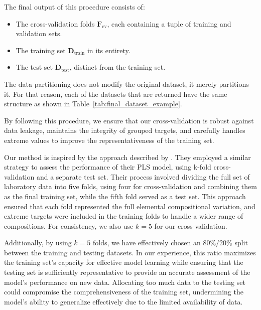 The final output of this procedure consists of:
\begin{itemize}
    \item The cross-validation folds \(\mathbf{F}_\text{cv}\), each containing a tuple of training and validation sets.
    \item The training set \(\mathbf{D}_\text{train}\) in its entirety.
    \item The test set \(\mathbf{D}_\text{test}\), distinct from the training set.
\end{itemize}

The data partitioning does not modify the original dataset, it merely partitions it.
For that reason, each of the datasets that are returned have the same structure as shown in Table~\ref{tab:final_dataset_example}.

By following this procedure, we ensure that our cross-validation is robust against data leakage, maintains the integrity of grouped targets, and carefully handles extreme values to improve the representativeness of the training set.

Our method is inspired by the approach described by \citet{andersonImprovedAccuracyQuantitative2017}.
They employed a similar strategy to assess the performance of their PLS model, using k-fold cross-validation and a separate test set.
Their process involved dividing the full set of laboratory data into five folds, using four for cross-validation and combining them as the final training set, while the fifth fold served as a test set.
This approach ensured that each fold represented the full elemental compositional variation, and extreme targets were included in the training folds to handle a wider range of compositions.
For consistency, we also use \(k=5\) for our cross-validation.

Additionally, by using $k=5$ folds, we have effectively chosen an 80\%/20\% split between the training and testing datasets.
In our experience, this ratio maximizes the training set's capacity for effective model learning while ensuring that the testing set is sufficiently representative to provide an accurate assessment of the model's performance on new data.
Allocating too much data to the testing set could compromise the comprehensiveness of the training set, undermining the model's ability to generalize effectively due to the limited availability of data.
